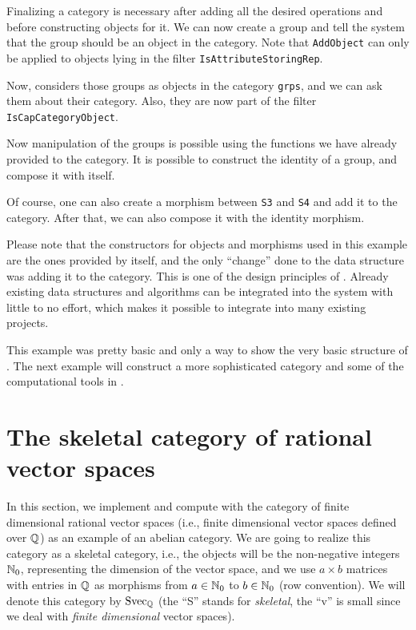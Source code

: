 

Finalizing a category is necessary after adding all the desired operations and before constructing objects
for it. We can now create a group and tell the system that the group should be an object in the category.
Note that \texttt{AddObject} can only be applied to \GAP objects lying in the filter
\texttt{IsAttributeStoringRep}.



Now, \CapPkg considers those groups as objects in the category \texttt{grps}, and we can
ask them about their category. Also, they are now part of the \GAP filter \texttt{IsCapCategoryObject}.



Now manipulation of the groups is possible using the functions we have already provided to the category.
It is possible to construct the identity of a group, and compose it with itself.



Of course, one can also create a morphism between \texttt{S3} and \texttt{S4} and add it to the category.
After that, we can also compose it with the identity morphism.



Please note that the constructors for objects and morphisms used in this example are the ones provided
by \GAP itself, and the only ``change'' done to the data structure was adding it to the category.
This is one of the design principles of \CapPkg. Already existing data structures and algorithms
can be integrated into the system with little to no effort, which makes it possible to integrate \CapPkg
into many existing projects.

This example was pretty basic and only a way to show the very basic structure of \CapPkg. The next example
will construct a more sophisticated category and some of the computational tools in \CapPkg.


\section{The skeletal category of rational vector spaces}

In this section, we implement and compute with the category of finite dimensional rational vector spaces
(i.e., finite dimensional vector spaces defined over $\mathbb{Q}$) as an
example of an abelian category. We are going
to realize this category as a skeletal category, i.e., the objects will be the non-negative integers $\mathbb{N}_0$,
representing the dimension of the vector space, and we use $a \times b$ matrices with entries in $\mathbb{Q}$ as morphisms
from $a \in \mathbb{N}_0$ to $b \in \mathbb{N}_0$ (row convention). We will denote this category by $\mathrm{Svec}_{\mathbb{Q}}$
(the ``S'' stands for \emph{skeletal}, the ``v'' is small since we deal with \emph{finite dimensional} vector spaces).

